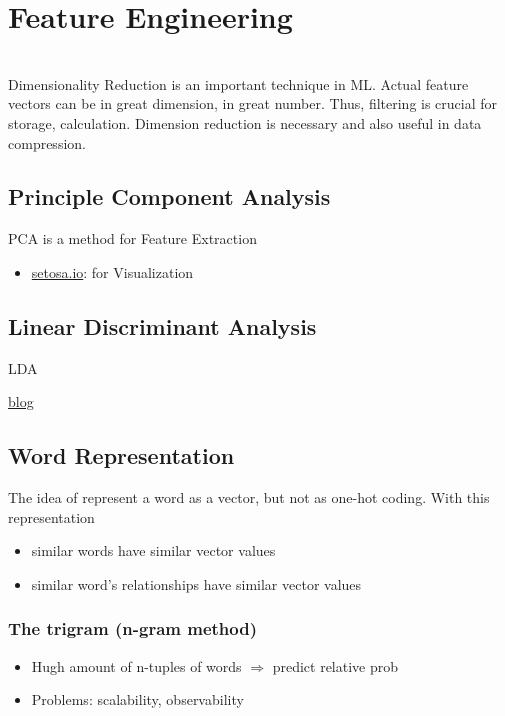 \chapter{Feature Engineering}
\label{cha:feature-engineering}
\\
Dimensionality Reduction is an important technique in \ac{ML}. Actual feature vectors can be in great  dimension, in great number. Thus, filtering is crucial for storage, calculation. Dimension reduction is necessary and also useful in data compression.

\todo{}
\section{Principle Component Analysis}
\ac{PCA} is a method for Feature Extraction

\begin{itemize}
	\item \href{https://setosa.io/ev/principal-component-analysis/}{setosa.io}: for Visualization
\end{itemize}

\section{Linear Discriminant Analysis}

\ac{LDA}

\href{https://sebastianraschka.com/Articles/2014_python_lda.html}{blog}

\section{Word Representation}
The idea of represent a word as a vector, but not as one-hot coding. With this representation
\begin{itemize}
	\item similar words have similar vector values
	\item similar word's relationships have similar vector values
\end{itemize}

\subsection{The trigram (n-gram method)}
\begin{itemize}
	\item Hugh amount of n-tuples of words $\Rightarrow$ predict relative \ac{prob}
	\item Problems: scalability, observability
\end{itemize}


